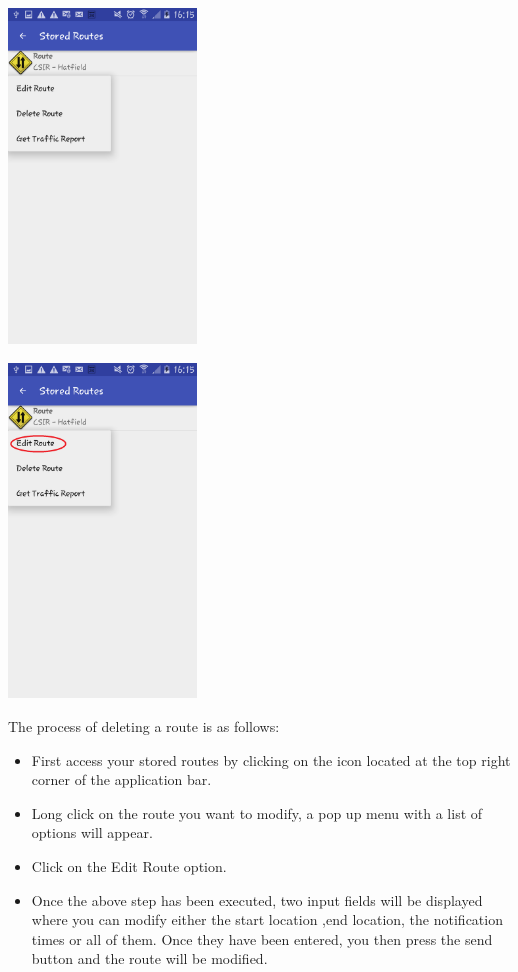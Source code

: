 \documentclass[a4paper,12pt]{article}
\begin{document}
\includegraphics[width=50mm, scale=0.5]{images/Options.png}
\begin{center}
\includegraphics[width=50mm, scale=0.5]{images/EditOption.png}
\end{center}
The process of deleting a route is as follows:
\begin{itemize}
    \item First access your stored routes by  clicking on the icon located at the top right corner of the application bar. 
    \item Long click on the route you want to modify, a pop up menu with a list of options will appear.
    \item Click on the Edit Route option.
    \item Once the above step has been executed, two input fields will be displayed  where you can modify either the start location ,end location, the notification times  or all of them. Once they have been entered, you then press the send button and the route will be modified.
\end{itemize}
\end{document}
